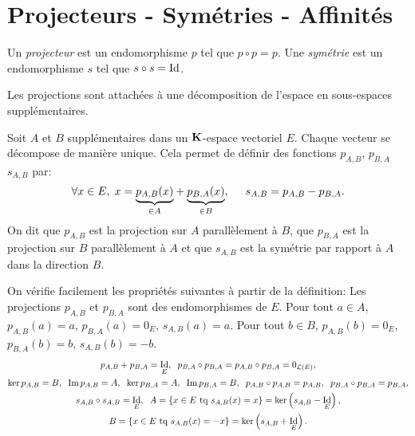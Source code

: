 \section{Projecteurs - Symétries - Affinités} \label{sec:proj}
\begin{defi}
 Un \emph{projecteur} est un endomorphisme $p$ tel que $p\circ p = p$. Une \emph{symétrie} est un endomorphisme $s$ tel que $s\circ s = \mathop{\mathrm{Id}}$.
\end{defi}
Les projections sont attachées à une décomposition de l'espace en sous-espaces supplémentaires.
\begin{defi}
 Soit $A$ et $B$ supplémentaires dans un $\mathbf{K}$-espace vectoriel $E$. Chaque vecteur se décompose de manière unique. 
 Cela permet de définir des fonctions $p_{A,B}$, $p_{B,A}$ $s_{A,B}$ par:
 \[
  \forall x \in E, \; x = \underset{\in A}{\underbrace{p_{A,B}(x)}} + \underset{\in B}{\underbrace{p_{B,A}(x)}}, \hspace{0.5cm} s_{A,B} = p_{A,B} - p_{B,A}.
 \]
 On dit que $p_{A,B}$ est la projection sur $A$ parallèlement à $B$, que $p_{B,A}$ est la projection sur $B$ parallèlement à $A$ et que $s_{A,B}$ est la symétrie par rapport à $A$ dans la direction $B$. 
\end{defi}
On vérifie facilement les propriétés suivantes à partir de la définition:\newline 
Les projections $p_{A,B}$ et $p_{B,A}$ sont des endomorphismes de $E$.\newline
Pour tout $a\in A$, $p_{A,B}(a) = a$, $p_{B,A}(a) = 0_E$, $s_{A,B}(a) = a$.\newline
Pour tout $b\in B$, $p_{A,B}(b) = 0_E$, $p_{B,A}(b) = b$, $s_{A,B}(b) = -b$. 
\begin{multline*}
 p_{A,B} + p_{B,A} = \mathop{\mathrm{Id}}_E,\hspace{0.2cm} p_{B,A} \circ p_{B,A} = p_{A,B} \circ p_{B,A} = 0_{\mathcal{L}(E)},\\
  \ker p_{A,B} = B,\hspace{0.2cm} \mathop{\mathrm{Im}} p_{A,B} = A,\hspace{0.2cm} 
 \ker p_{B,A} = A,\hspace{0.2cm} \mathop{\mathrm{Im}} p_{B,A} = B,\hspace{0.2cm} p_{A,B} \circ  p_{A,B} = p_{A,B},\hspace{0.2cm}  p_{B,A}\circ  p_{B,A} = p_{B,A},\\
 s_{A,B}\circ  s_{A,B} = \mathop{\mathrm{Id}}_E,\hspace{0.2cm} A = \left\lbrace x \in E \text{ tq } s_{A,B}(x) = x\right\rbrace =\ker\left( s_{A,B}-\mathop{\mathrm{Id}}_E\right), \\
 B = \left\lbrace x \in E \text{ tq } s_{A,B}(x) = -x\right\rbrace =\ker\left( s_{A,B}+\mathop{\mathrm{Id}}_E\right).
\end{multline*}
